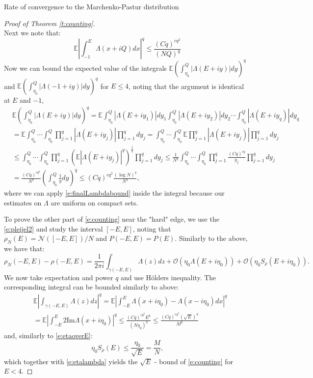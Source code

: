 \documentclass[11pt, a4paper, oneside]{book}
\numberwithin{equation}{chapter}
\newcommand{\E}{\mathbb E}
\begin{document}
\begin{section}{Rate of convergence to the Marchenko-Pastur distribution}
\begin{proof}[Proof of Theorem \ref{t:counting}]
\begin{equation}
\end{equation}
%
Next we note that:
%
\begin{equation}
\E \left|\int_{-1}^E  \Lambda(x + iQ) dx \right|^q \leq \frac{(Cq)^{cq^2}}{(NQ)^q}
\end{equation}
%
Now we can bound the expected value of the integrals $ \E \left ( \int_{\eta_0}^Q | \Lambda( E+iy) |dy \right )^q $ and $ \E \left ( \int_{\eta_0}^Q | \Lambda( -1 +iy) |dy \right )^q $ for $E \leq 4$, noting that the argument is identical at $E$ and $-1$,
%
\begin{align*}
&\E \left ( \int_{\eta_0}^Q | \Lambda(E +iy) |dy \right )^q = \E \int_{\eta_0}^Q | \Lambda(E +iy_1) |dy_1 \int_{\eta_0}^Q | \Lambda(E+iy_2) |dy_2 \cdots \int_{\eta_0}^Q | \Lambda(E+iy_q) |dy_q \\
&= \E \int_{\eta_0}^Q \cdots \int_{\eta_0}^Q \prod_{j=1}^q | \Lambda(E +iy_j) | \prod_{j=1}^q dy_j = \int_{\eta_0}^Q \cdots \int_{\eta_0}^Q \E \prod_{j=1}^q | \Lambda(E +iy_j) | \prod_{j=1}^q dy_j \\
&\leq
 \int_{\eta_0}^Q \cdots \int_{\eta_0}^Q \prod_{j=1}^q \left (\E | \Lambda(E+iy_j) |^q \right )^{\frac{1}{q}}  \prod_{j=1}^q dy_j
\leq
 \frac{1}{N^q}  \int_{\eta_0}^Q \cdots \int_{\eta_0}^Q \prod_{j=1}^q \frac{(Cq)^{cq}}{y_j} \prod_{j=1}^q dy_j \\
&= \frac{(Cq)^{cq^2}}{N^q} \left ( \int_{\eta_0}^Q \frac{1}{y} dy \right )^q \leq (Cq)^{cq^2}  \frac{(\log N)^q}{N^q} ,
\end{align*}
%
where we can apply \eqref{e:finalLambdabound} inside the integral because our estimates on $\Lambda$ are uniform on compact sets.

To prove the other part of \eqref{e:counting} near the "hard" edge, we use the  \eqref{e:pleijel2} and study the interval $[-E, E]$, noting that $ \rho_N(E) = \mathcal{N}([-E, E])/N $  and $P(-E,E) = P(E)$. Similarly to the above, we have that:
\[
\rho_N(-E,E) - \rho(-E,E) =  \frac{1}{2\pi i } \int_{\gamma(-E,E)} \Lambda(z) dz + \mathcal{O} \left ( \eta_0 \Lambda(E+i\eta_0) \right ) + \mathcal{O} \left ( \eta_0 S_{\rho}(E+i\eta_0) \right ) .
\]
%
We now take expectation and power $q$ and use H\"olders inequality. The corresponding integral can be bounded similarly to above:
%
\begin{align*}
&\E \left | \int_{\gamma(-E,E)} \Lambda(z)dz \right |^q = 
\mathbb{E}\left|\int_{-E}^E \Lambda\left(x+i \eta_0\right)-\Lambda\left(x-i \eta_0\right) d x\right|^q \\
&=\mathbb{E}\left|\int_{-E}^E 2 \mathrm{Im} \Lambda \left(x+i \eta_0\right)\right|^q
\leq \frac{(C q)^{c q^2} E^q}{\left(N \eta_0\right)^q} \leq \frac{(C q)^{c q^2}(\sqrt{E})^q}{M^q}
\end{align*}
%
and, similarly to \eqref{e:etaoverE}:
%
\begin{equation}\label{e:deltabound}
\eta_0 S_{\rho}(E) \leq \frac{\eta_0}{\sqrt{E}}=\frac{M}{N} ,
\end{equation}
%
which together with \eqref{e:etalambda} yields the $\sqrt{E}$ - bound of \eqref{e:counting} for $E<4$.


\end{proof}
\end{section}
\end{document}
